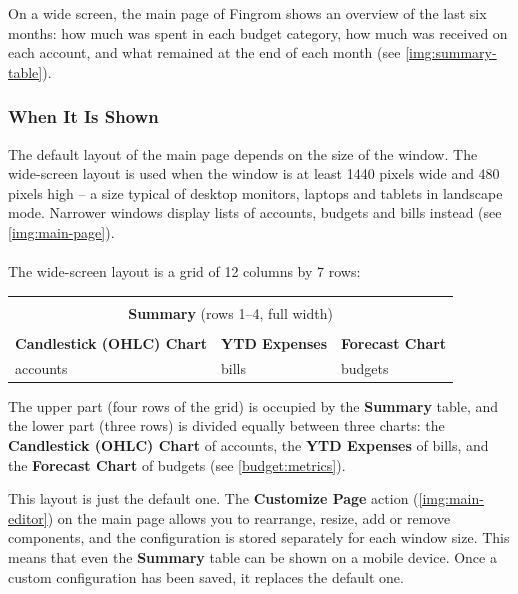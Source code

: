On a wide screen, the main page of Fingrom shows an overview of the last six months: how much
was spent in each budget category, how much was received on each account, and what remained
at the end of each month (see \cref{img:summary-table}).



\subsubsection{When It Is Shown}

The default layout of the main page depends on the size of the window. The
wide-screen layout is used when the window is at least 1440 pixels wide and 480 pixels high
-- a size typical of desktop monitors, laptops and tablets in landscape mode. Narrower
windows display lists of accounts, budgets and bills instead (see \cref{img:main-page}).\\
\\

\noindent The wide-screen layout is a grid of 12 columns by 7 rows:

\begin{center}
\begin{tabular}{|p{}|p{}|p{}|}
  \hline
  \multicolumn{3}{|c|}{} \\
  \multicolumn{3}{|c|}{\textbf{Summary} (rows 1--4, full width)} \\
  \multicolumn{3}{|c|}{} \\
  \hline
  \centering \textbf{Candlestick (OHLC) Chart} &
  \centering \textbf{YTD Expenses} &
  \centering \textbf{Forecast Chart} \tabularnewline
  \centering accounts & \centering bills & \centering budgets \tabularnewline
  \hline
\end{tabular}
\end{center}

\noindent The upper part (four rows of the grid) is occupied by the \textbf{Summary} table,
and the lower part (three rows) is divided equally between three charts: the
\textbf{Candlestick (OHLC) Chart} of accounts, the \textbf{YTD Expenses} of bills, and the
\textbf{Forecast Chart} of budgets (see \cref{budget:metrics}).

This layout is just the default one. The \textbf{Customize Page} action
(\cref{img:main-editor}) on the main page allows you to rearrange, resize, add or remove
components, and the configuration is stored separately for each window size. This means that
even the \textbf{Summary} table can be shown on a mobile device. Once a custom configuration
has been saved, it replaces the default one.

